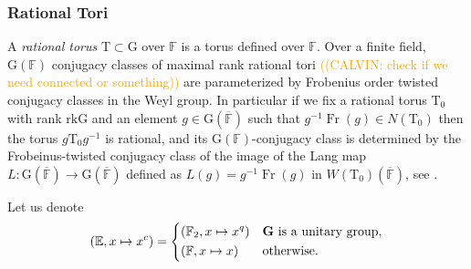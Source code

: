\documentclass[12pt, reqno]{amsart}
\theoremstyle{definition}
\theoremstyle{definition}
\theoremstyle{definition}
\newcommand{\involution}[1]{#1^{c}}
\newcommand{\finiteField}{\mathbb{F}}
\newcommand{\quadraticExtension}{\mathbb{E}}
\newcommand{\finiteFieldExtension}[1]{\finiteField_{#1}}
\newcommand{\algebraicClosure}[1]{\overline{#1}}
\newcommand{\Frobenius}{\operatorname{Fr}}
\newcommand{\algebraicGroup}[1]{\boldsymbol{\mathrm{#1}}}
\newcommand{\calvin}[1]{\textcolor{orange}{\sffamily ((CALVIN: #1))}}
\begin{document}
\subsubsection{Rational Tori}
A \emph{rational torus} $\algebraicGroup{T} \subset \algebraicGroup{G}$ over $\finiteField$ is a torus defined over $\finiteField$. 
Over a finite field, $\algebraicGroup{G}(\finiteField)$ conjugacy classes of maximal rank rational tori \calvin{check if we need connected or something} are parameterized by  Frobenius order twisted conjugacy classes in the Weyl group. In particular if we fix a rational torus $\algebraicGroup{T}_0$ with rank $\mathrm{rk} \algebraicGroup{G}$ and an element $g \in \algebraicGroup{G}(\algebraicClosure{\finiteField})$ such that $g^{-1}\Frobenius(g) \in N(\algebraicGroup{T}_0)$ then the torus $g\algebraicGroup{T}_0g^{-1}$ is rational, and its $\algebraicGroup{G}(\finiteField)$-conjugacy class is determined  by the Frobeinus-twisted conjugacy class of the image of the Lang map $L \colon \algebraicGroup{G}\left(\algebraicClosure{\finiteField}\right) \to \algebraicGroup{G}\left(\algebraicClosure{\finiteField}\right)$ defined as $L\left(g\right) = g^{-1}\Frobenius(g)$ in $W(\algebraicGroup{T}_0)(\algebraicClosure{\mathbb{F}})$, see \cite[Section 3.3]{Carter1985}.



Let us denote $$\left(\quadraticExtension, x \mapsto \involution{x}\right) = \begin{dcases}
	\left(\finiteFieldExtension{2}, x \mapsto x^q\right)  & \algebraicGroup{G} \text{ is a unitary group},\\
	\left(\finiteField, x \mapsto x\right) & \text{otherwise.}
\end{dcases}$$
\end{document}

